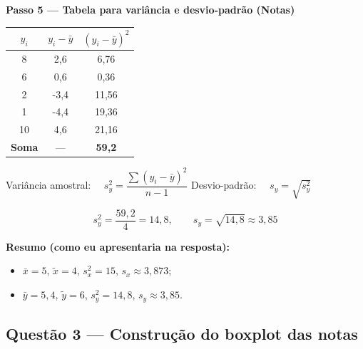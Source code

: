 \begin{SolvedBox}
\textbf{Passo 5 — Tabela para variância e desvio-padrão (Notas)}



\begin{center}
\begin{tabular}{@{}c|c|c@{}}\toprule
$\,y_i\,$ & $y_i - \bar{y}$ & $(y_i - \bar{y})^2$ \\\midrule
8  & 2{,}6  & 6{,}76 \\
6  & 0{,}6  & 0{,}36 \\
2  & -3{,}4 & 11{,}56 \\
1  & -4{,}4 & 19{,}36 \\
10 & 4{,}6  & 21{,}16 \\\midrule
\textbf{Soma} & --- & \textbf{59{,}2} \\\bottomrule
\end{tabular}
\end{center}



\begin{FormulaBox}
Variância amostral: $\quad s_y^2 = \dfrac{\sum (y_i - \bar{y})^2}{n-1}$ \qquad
Desvio-padrão: $\quad s_y = \sqrt{s_y^2}$
\end{FormulaBox}

\[
s_y^2 = \frac{59{,}2}{4} = 14{,}8,
\qquad
s_y = \sqrt{14{,}8} \approx 3{,}85
\]

\textbf{Resumo (como eu apresentaria na resposta):}
\begin{itemize}[leftmargin=*]
  \item $\bar{x}=5$, $\tilde{x}=4$, $s_x^2=15$, $s_x\approx 3{,}873$;
  \item $\bar{y}=5{,}4$, $\tilde{y}=6$, $s_y^2=14{,}8$, $s_y\approx 3{,}85$.
\end{itemize}
\end{SolvedBox}


\subsection*{Questão 3 — Construção do boxplot das notas}

